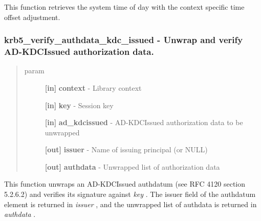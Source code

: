 \documentclass[letterpaper,10pt,english]{sphinxmanual}
\begin{document}
This function retrieves the system time of day with the context specific time offset adjustment.


\subsubsection{krb5\_verify\_authdata\_kdc\_issued -  Unwrap and verify AD-KDCIssued authorization data.}
\label{appdev/refs/api/krb5_verify_authdata_kdc_issued:krb5-verify-authdata-kdc-issued-unwrap-and-verify-ad-kdcissued-authorization-data}\label{appdev/refs/api/krb5_verify_authdata_kdc_issued::doc}

\begin{fulllineitems}
\label{appdev/refs/api/krb5_verify_authdata_kdc_issued:c.krb5_verify_authdata_kdc_issued}
\end{fulllineitems}

\begin{quote}\begin{description}
\item[{param}] \leavevmode
\textbf{{[}in{]}} \textbf{context} - Library context

\textbf{{[}in{]}} \textbf{key} - Session key

\textbf{{[}in{]}} \textbf{ad\_kdcissued} - AD-KDCIssued authorization data to be unwrapped

\textbf{{[}out{]}} \textbf{issuer} - Name of issuing principal (or NULL)

\textbf{{[}out{]}} \textbf{authdata} - Unwrapped list of authorization data

\end{description}\end{quote}

This function unwraps an AD-KDCIssued authdatum (see RFC 4120 section 5.2.6.2) and verifies its signature against \emph{key} . The issuer field of the authdatum element is returned in \emph{issuer} , and the unwrapped list of authdata is returned in \emph{authdata} .
\end{document}
